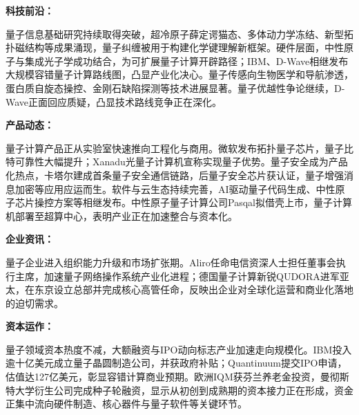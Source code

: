 \documentclass[12pt,a4paper]{ctexart}
\begin{document}
\textbf{ 科技前沿：}

量子信息基础研究持续取得突破，超冷原子薛定谔猫态、多体动力学冻结、新型拓扑磁结构等成果涌现，量子纠缠被用于构建化学键理解新框架。硬件层面，中性原子与集成光子学成功结合，为可扩展量子计算开辟路径；IBM、D-Wave相继发布大规模容错量子计算路线图，凸显产业化决心。量子传感向生物医学和导航渗透，蛋白质自旋态操控、金刚石缺陷探测等技术进展显著。量子优越性争论继续，D-Wave正面回应质疑，凸显技术路线竞争正在深化。


\textbf{ 产品动态：}

量子计算产品正从实验室快速推向工程化与商用。微软发布拓扑量子芯片，量子比特可靠性大幅提升；Xanadu光量子计算机宣称实现量子优势。量子安全成为产品化热点，卡塔尔建成首条量子安全通信链路，后量子安全芯片获认证，量子增强消息加密等应用应运而生。软件与云生态持续完善，AI驱动量子代码生成、中性原子芯片操控方案等相继发布。中性原子量子计算公司Pasqal拟借壳上市，量子计算机部署至超算中心，表明产业正在加速整合与资本化。


\textbf{ 企业资讯：}

量子企业进入组织能力升级和市场扩张期。Aliro任命电信资深人士担任董事会执行主席，加速量子网络操作系统产业化进程；德国量子计算新锐QUDORA进军亚太，在东京设立总部并完成核心高管任命，反映出企业对全球化运营和商业化落地的迫切需求。


\textbf{ 资本运作：}

量子领域资本热度不减，大额融资与IPO动向标志产业加速走向规模化。IBM投入逾十亿美元成立量子晶圆制造公司，并获政府补贴；Quantinuum提交IPO申请，估值达127亿美元，彰显容错计算商业预期。欧洲IQM获芬兰养老金投资，曼彻斯特大学衍生公司完成种子轮融资，显示从初创到成熟期的资本接力正在形成，资金正集中流向硬件制造、核心器件与量子软件等关键环节。
\end{document}
